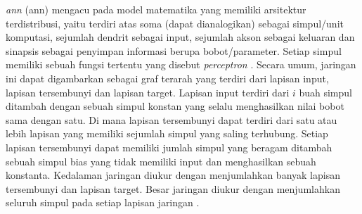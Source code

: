 \textit{\acrlong{ann}} (\acrshort{ann}) mengacu pada model matematika yang memiliki arsitektur terdistribusi, yaitu terdiri atas soma (dapat dianalogikan) sebagai simpul/unit komputasi, sejumlah dendrit sebagai input, sejumlah akson sebagai keluaran dan sinapsis sebagai penyimpan informasi berupa bobot/parameter. Setiap simpul memiliki sebuah fungsi tertentu yang disebut \textit{perceptron} . Secara umum, jaringan ini dapat digambarkan sebagai graf terarah yang terdiri dari lapisan input, lapisan tersembunyi dan lapisan target. Lapisan input terdiri dari $i$ buah simpul ditambah dengan sebuah simpul konstan yang selalu menghasilkan nilai bobot sama dengan satu. Di mana lapisan tersembunyi dapat terdiri dari satu atau lebih lapisan yang memiliki sejumlah simpul yang saling terhubung. Setiap lapisan tersembunyi dapat memiliki jumlah simpul yang beragam ditambah sebuah simpul bias yang tidak memiliki input dan menghasilkan sebuah konstanta. Kedalaman jaringan diukur dengan menjumlahkan banyak lapisan tersembunyi dan lapisan target. Besar jaringan diukur dengan menjumlahkan seluruh simpul pada setiap lapisan jaringan .

